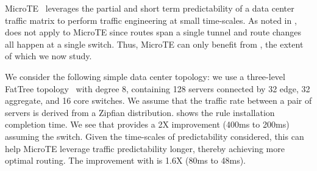 

MicroTE~\cite{microte} leverages the partial and short term
predictability of a data center traffic matrix to perform traffic engineering
at small time-scales. As noted in , \FE does not apply to
MicroTE since routes span a single tunnel and route changes all happen at a
single switch. Thus, MicroTE can only benefit from \RO, the extent of which we
now study.







We consider the following simple data center topology: we use a three-level FatTree topology~\cite{fattree-sigcomm08} with degree 8, containing 128 servers connected by 32 edge, 32 aggregate, and 16 core switches.
We
assume that the traffic rate between a pair of servers is derived from a
Zipfian distribution.  shows the rule installation
completion time. We see that \RO provides a 2X improvement (400ms to 200ms)
assuming the \BroadcomOne switch. Given the time-scales of predictability
considered, this can help MicroTE leverage traffic predictability longer,
thereby achieving more optimal routing. The improvement with \Intel is 1.6X
(80ms to 48ms).

